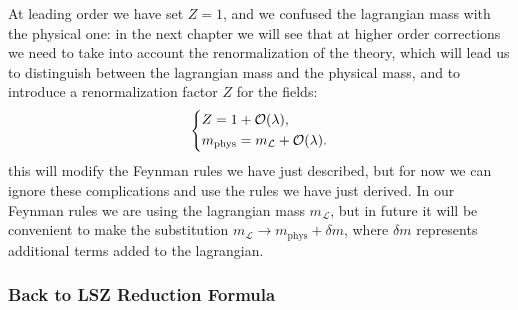 \begin{remark}
    At leading order we have set \(Z=1\), and we confused the lagrangian mass with the physical one: in the next chapter we will see that at higher order corrections we need to take into account the renormalization of the theory, which will lead us to distinguish between the lagrangian mass and the physical mass, and to introduce a renormalization factor \(Z\) for the fields:
    \[
        \begin{dcases}
            Z = 1 + \mathcal{O}(\lambda), \\
            m_\text{phys} = m_{\mathcal{L}} + \mathcal{O}(\lambda).
        \end{dcases}
    \]
    this will modify the Feynman rules we have just described, but for now we can ignore these complications and use the rules we have just derived. In our Feynman rules we are using the lagrangian mass \(m_{\mathcal{L}}\), but in future it will be convenient to make the substitution \(m_{\mathcal{L}} \to m_\text{phys} + \delta m\), where \(\delta m\) represents additional terms added to the lagrangian.
\end{remark}

\subsubsection{Back to LSZ Reduction Formula}

